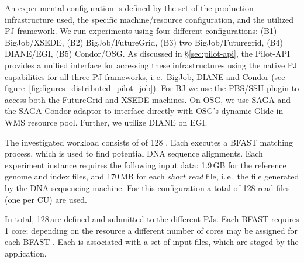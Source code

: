 \documentclass[conference]{IEEEtran}
\begin{document}
An experimental configuration is defined by the set of the production
infrastructure used, the specific machine/resource configuration, and
the utilized PJ framework.  We run experiments using four different
configurations: (B1) BigJob/XSEDE, (B2) BigJob/FutureGrid, (B3) two
BigJob/Futuregrid, (B4) DIANE/EGI, (B5) Condor/OSG.   As discussed in
\S\ref{sec:pilot-api}, the Pilot-API provides a unified interface for
accessing these infrastructures using the native PJ  capabilities for all three PJ
frameworks, i.\,e.\ BigJob, DIANE and Condor (see
figure~\ref{fig:figures_distributed_pilot_job}).  For BJ we use the
PBS/SSH plugin to access both the FutureGrid and XSEDE machines.  On
OSG, we use SAGA and the SAGA-Condor adaptor to interface directly
with OSG's dynamic Glide-in-WMS resource pool. Further, we utilize
DIANE on EGI.

The investigated workload consists of of 128 \cus. Each \cu executes a
BFAST matching process, which is used to find potential DNA sequence
alignments. Each experiment instance requires the following input
data: 1.9\,GB for the reference genome and index files, and 170\,MB
for each \textit{short read} file, i.\,e.\ the file generated by the
DNA sequencing machine. For this configuration a total of 128 read
files (one per CU) are used.


 In total,
128\,\cus are defined and submitted to the different PJs. Each BFAST \cu
requires 1 core; depending on the resource a different number of cores may be
assigned for each BFAST \cu. Each \cu is associated with a set of input files,
which are staged by the application.


\end{document}

